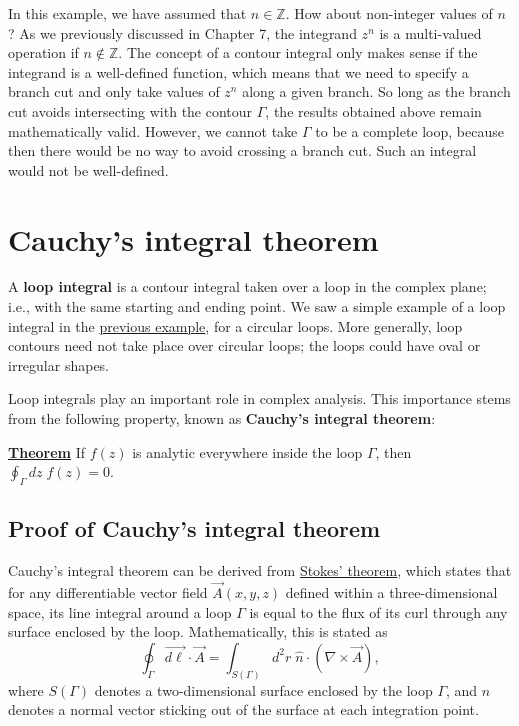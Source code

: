 \documentclass[10pt,a4paper]{article}
\begin{document}
In this example, we have assumed that $n \in \mathbb{Z}$. How about
non-integer values of $n$?  As we previously discussed in Chapter 7,
the integrand $z^n$ is a multi-valued operation if $n
\notin\mathbb{Z}$. The concept of a contour integral only makes sense
if the integrand is a well-defined function, which means that we need
to specify a branch cut and only take values of $z^n$ along a given
branch. So long as the branch cut avoids intersecting with the contour
$\Gamma$, the results obtained above remain mathematically
valid. However, we cannot take $\Gamma$ to be a complete loop, because
then there would be no way to avoid crossing a branch cut. Such an
integral would not be well-defined.

\section{Cauchy's integral theorem}
\label{cauchys_theorem}

A \textbf{loop integral} is a contour integral taken over a loop in
the complex plane; i.e., with the same starting and ending point. We
saw a simple example of a loop integral in the
\hyperref[a-contour-integral-over-a-circular-arc]{previous example},
for a circular loops. More generally, loop contours need not take
place over circular loops; the loops could have oval or irregular
shapes.

Loop integrals play an important role in complex analysis. This
importance stems from the following property, known as
\textbf{Cauchy's integral theorem}:

\begin{framed}
\noindent
\underline{\textbf{Theorem}}
\vskip 0.02in \noindent
If $f(z)$ is analytic everywhere inside the loop $\Gamma$, then
$\displaystyle\oint_\Gamma dz\; f(z) = 0.$
\end{framed}

\subsection{Proof of Cauchy's integral theorem}
\label{proof-of-cauchys-integral-theorem}

Cauchy's integral theorem can be derived from
\href{http://en.wikipedia.org/wiki/Stokes'_theorem}{Stokes' theorem},
which states that for any differentiable vector field $\vec{A}(x,y,z)$
defined within a three-dimensional space, its line integral around a
loop $\Gamma$ is equal to the flux of its curl through any surface
enclosed by the loop. Mathematically, this is stated as
\begin{equation}
  \oint_\Gamma \vec{d\ell} \cdot \vec{A} = \int_{S(\Gamma)} d^2r \;
  \hat{n} \cdot \left(\nabla \times \vec{A}\right),
\end{equation}
where $S(\Gamma)$ denotes a two-dimensional surface enclosed by the
loop $\Gamma$, and $\hat{n}$ denotes a normal vector sticking out of
the surface at each integration point.
\end{document}
